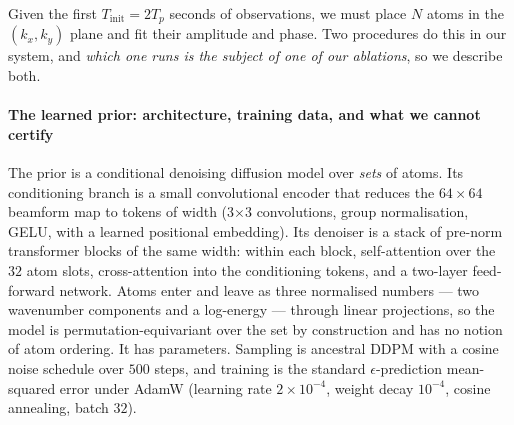 \documentclass[review]{elsarticle}
\begin{document}
Given the first $T_{\text{init}} = 2 T_p$ seconds of observations, we must place
$N$ atoms in the $(k_x, k_y)$ plane and fit their amplitude and phase. Two
procedures do this in our system, and \emph{which one runs is the subject of one of
our ablations}, so we describe both.

\paragraph{The learned prior: architecture, training data, and what we cannot certify}
The prior is a conditional denoising diffusion model over \emph{sets} of atoms. Its
conditioning branch is a small convolutional encoder that reduces the
$64 \times 64$ beamform map to \PriorTokens{} tokens of width \PriorDim{}
(3$\times$3 convolutions, group normalisation, GELU, with a learned positional
embedding). Its denoiser is a stack of \PriorBlocks{} pre-norm transformer blocks
of the same width: within each block, self-attention over the $32$ atom slots,
cross-attention into the conditioning tokens, and a two-layer feed-forward network.
Atoms enter and leave as three normalised numbers --- two wavenumber components and
a log-energy --- through linear projections, so the model is permutation-equivariant
over the set by construction and has no notion of atom ordering. It has
\PriorParams{} parameters. Sampling is ancestral DDPM with a cosine noise schedule
over $500$ steps, and training is the standard $\epsilon$-prediction mean-squared
error under AdamW (learning rate $2\times 10^{-4}$, weight decay $10^{-4}$, cosine
annealing, batch $32$).
\end{document}
